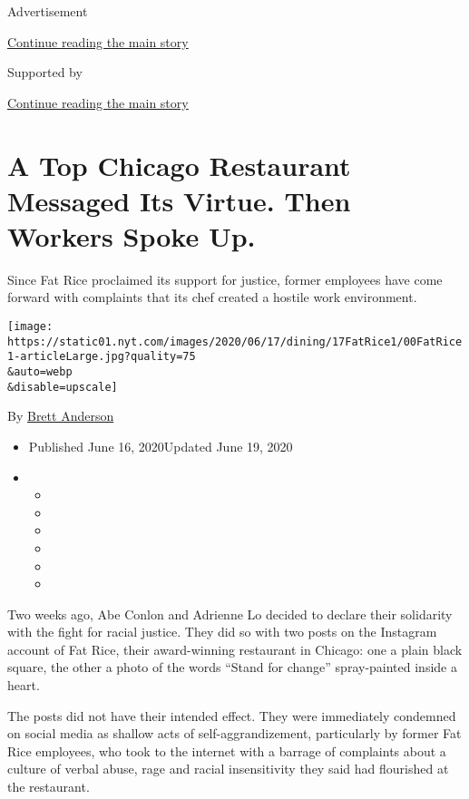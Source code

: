 Advertisement

\protect\hyperlink{after-top}{Continue reading the main story}

Supported by

\protect\hyperlink{after-sponsor}{Continue reading the main story}

\hypertarget{a-top-chicago-restaurant-messaged-its-virtue-then-workers-spoke-up}{%
\section{A Top Chicago Restaurant Messaged Its Virtue. Then Workers
Spoke
Up.}\label{a-top-chicago-restaurant-messaged-its-virtue-then-workers-spoke-up}}

Since Fat Rice proclaimed its support for justice, former employees have
come forward with complaints that its chef created a hostile work
environment.

\texttt{[image: https://static01.nyt.com/images/2020/06/17/dining/17FatRice1/00FatRice1-articleLarge.jpg?quality=75\\\&auto=webp\\\&disable=upscale]}

By \href{https://www.nytimes.com/by/brett-anderson}{Brett Anderson}

\begin{itemize}
\item
  Published June 16, 2020Updated June 19, 2020
\item
  \begin{itemize}
  \item
  \item
  \item
  \item
  \item
  \item
  \end{itemize}
\end{itemize}

Two weeks ago, Abe Conlon and Adrienne Lo decided to declare their
solidarity with the fight for racial justice. They did so with two posts
on the Instagram account of Fat Rice, their award-winning restaurant in
Chicago: one a plain black square, the other a photo of the words
``Stand for change'' spray-painted inside a heart.

The posts did not have their intended effect. They were immediately
condemned on social media as shallow acts of self-aggrandizement,
particularly by former Fat Rice employees, who took to the internet with
a barrage of complaints about a culture of verbal abuse, rage and racial
insensitivity they said had flourished at the restaurant.

